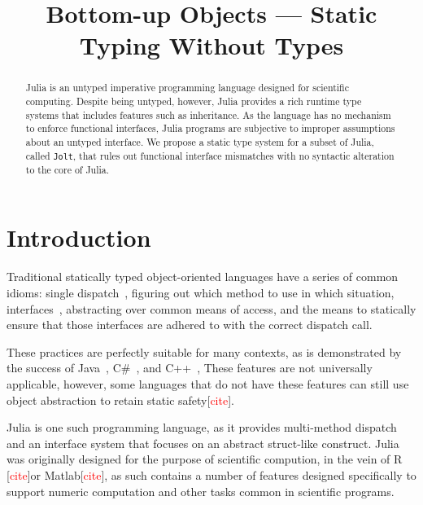 \documentclass[preprint]{sigplanconf}
\newcommand{\xt}[1]{\texttt{#1}}
\newcommand{\jolt}{\xt{Jolt}}
\begin{document}
\title{Bottom-up Objects --- Static Typing Without Types} 
\maketitle

\begin{abstract}
Julia is an untyped imperative programming language designed for scientific computing. 
Despite being untyped, however, Julia provides a rich runtime type systems that includes features such as  
inheritance. As the language has no mechanism to enforce functional interfaces, Julia programs 
are subjective to improper assumptions about an untyped interface. We propose a static type system for a 
subset of Julia, called \jolt, that rules out functional interface mismatches
with no syntactic alteration to the core of Julia.
\end{abstract}


\section{Introduction}

Traditional statically typed object-oriented languages have a series of
common idioms: single dispatch~\cite{jls}, figuring out which method
to use in which situation, interfaces~\cite{objinter, fj}, abstracting over 
common means of access, and the means to statically
ensure that those interfaces are adhered to with the correct dispatch call.

These practices are perfectly suitable for many contexts,
as is demonstrated by the success of Java~\cite{jls}, C\#~\cite{csls}, and C++~\cite{cppls}, 
These features are not universally applicable, however, some languages that do not have these features
can still use object abstraction to retain static safety[\textcolor{red}{cite}].

Julia is one such programming language, as it provides multi-method dispatch 
and an interface system that focuses on an abstract struct-like construct. 
Julia was originally designed for the purpose of scientific compution, in the vein of 
R [\textcolor{red}{cite}]or Matlab[\textcolor{red}{cite}], as such contains a number of features designed specifically to support 
numeric computation and other tasks common in scientific programs.
\end{document}
